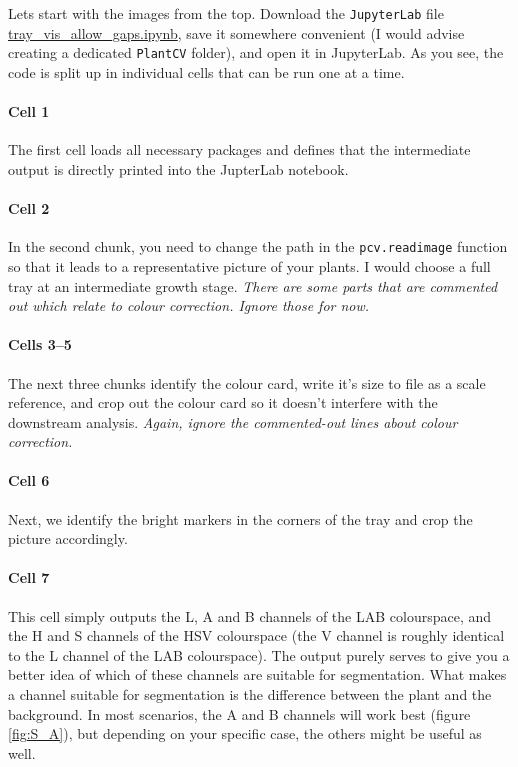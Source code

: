 \documentclass[10pt]{article}
\begin{document}
Lets start with the images from the top. Download the \texttt{JupyterLab} file \href{https://github.com/leonardblaschek/plantcv/blob/master/tray_vis_allow_gaps.ipynb}{tray\_vis\_allow\_gaps.ipynb}, save it somewhere convenient (I would advise creating a dedicated \texttt{PlantCV} folder), and open it in JupyterLab. As you see, the code is split up in individual cells that can be run one at a time. 

\paragraph*{Cell 1} The first cell loads all necessary packages and defines that the intermediate output is directly printed into the JupterLab notebook.

\paragraph*{Cell 2} In the second chunk, you need to change the path in the \texttt{pcv.readimage} function so that it leads to a representative picture of your plants. I would choose a full tray at an intermediate growth stage. \textit{There are some parts that are commented out which relate to colour correction. Ignore those for now.}

\paragraph*{Cells 3--5} The next three chunks identify the colour card, write it's size to file as a scale reference, and crop out the colour card so it doesn't interfere with the downstream analysis. \textit{Again, ignore the commented-out lines about colour correction.}

\paragraph*{Cell 6} Next, we identify the bright markers in the corners of the tray and crop the picture accordingly.

\paragraph*{Cell 7} This cell simply outputs the L, A and B channels of the LAB colourspace, and the H and S channels of the HSV colourspace (the V channel is roughly identical to the L channel of the LAB colourspace). The output purely serves to give you a better idea of which of these channels are suitable for segmentation. What makes a channel suitable for segmentation is the difference between the plant and the background. In most scenarios, the A and B channels will work best (figure \ref{fig:S_A}), but depending on your specific case, the others might be useful as well.
\end{document}
